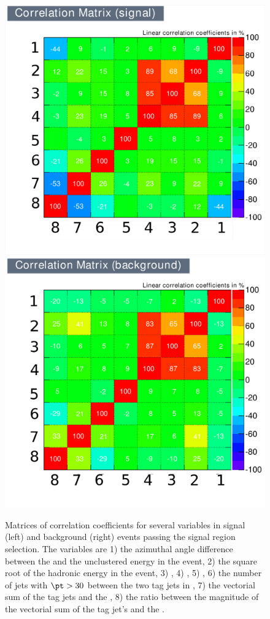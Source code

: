 \begin{figure}
    \includegraphics[width=.6\largefigwidth]{plots/parked/AN-14-243-figs/inputcorrsig.pdf}
    \includegraphics[width=.6\largefigwidth]{plots/parked/AN-14-243-figs/inputcorrbkg.pdf}
  \caption{Matrices of correlation coefficients for several variables in signal (left) and background (right) events passing the signal region selection. The variables are 1) the azimuthal angle difference between the \METnoMU and the unclustered energy in the event, 2) the square root of the hadronic energy in the event, 3) \METsig, 4) \METnoMU, 5) \Mjj, 6) the number of jets with $\pt>30$ \GeV between the two tag jets in \eta, 7) the vectorial sum of the tag jets \pt and the \METnoMU, 8) the ratio between the magnitude of the vectorial sum of the tag jet's \pt and the \METnoMU.}
  \label{fig:parkedmvacorr}
\end{figure}

